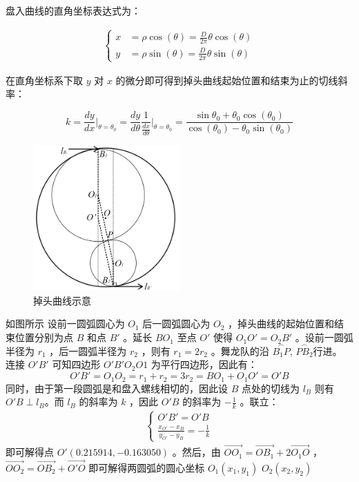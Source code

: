 \documentclass[a4paper]{article}
\begin{document}
		盘入曲线的直角坐标表达式为：

		\begin{align}
			\left\{
			\begin{aligned}
				x &= \rho \cos(\theta) = \frac{D}{2\pi} \theta \cos(\theta) \\
				y &= \rho \sin(\theta) = \frac{D}{2\pi} \theta \sin(\theta)
			\end{aligned}
			\right.
		\end{align}

		在直角坐标系下取 $y$ 对 $x$ 的微分即可得到掉头曲线起始位置和结束为止的切线斜率：

		\begin{equation}
			k = \frac{dy}{dx}\Bigg|_{\theta=\theta_0} = \frac{dy}{d\theta} \frac{1}{\frac{dx}{d\theta}} \Bigg|_{\theta=\theta_0} = \frac{\sin\theta_0 + \theta_0 \cos(\theta_0)}{\cos(\theta_0) - \theta_0 \sin(\theta_0)}
		\end{equation}
		
		\begin{figure}[H]
			\centering
			\includegraphics[width=0.5\textwidth]{image/Figure_5411.png}
			\caption{掉头曲线示意}
			\label{Figure_5411}
		\end{figure}

		如图所示 %
		设前一圆弧圆心为 $O_1$ 后一圆弧圆心为 $O_2$ ，掉头曲线的起始位置和结束位置分别为点 $B$ 和点 $B'$ 。延长 $B O_1$ 至点 $O'$ 使得 $O_1O' = O_2B'$ 。设前一圆弧半径为 $r_1$ ，后一圆弧半径为 $r_2$ ，则有 $r_1 = 2r_2$ 。舞龙队的沿 $\overset{\frown}{B_1 P}$, $\overset{\frown}{PB_2}$行进。 连接 $O'B'$ 可知四边形 $O'B'O_2O1$ 为平行四边形，因此有：
		$$ O'B'= O_1O_2 = r_1 + r_2 = 3r_2 = BO_1 + O_1O' = O'B$$
		同时，由于第一段圆弧是和盘入螺线相切的，因此设 $B$ 点处的切线为 $l_B$ 则有 $O'B \perp l_B$。而 $l_B$ 的斜率为 $k$ ，因此 $O'B$ 的斜率为 $-\frac{1}{k}$ 。联立：
		\begin{align}
			\left\{
			\begin{aligned}
				O'B'=O'B \\
				\frac{x_{O'} - x_B}{y_{O'} - y_B} = -\frac{1}{k}
			\end{aligned}
			\right.
		\end{align}
		即可解得点 $O'(0.215914, -0.163050)$ 。然后，由 $\overrightarrow{OO_1} = \overrightarrow{OB_1} + 2\overrightarrow{O_1O}$ ， $\overrightarrow{OO_2} = \overrightarrow{OB_2} + \overrightarrow{O'O}$ 即可解得两圆弧的圆心坐标 $O_1(x_1, y_1)$ $O_2(x_2, y_2)$
\end{document}
